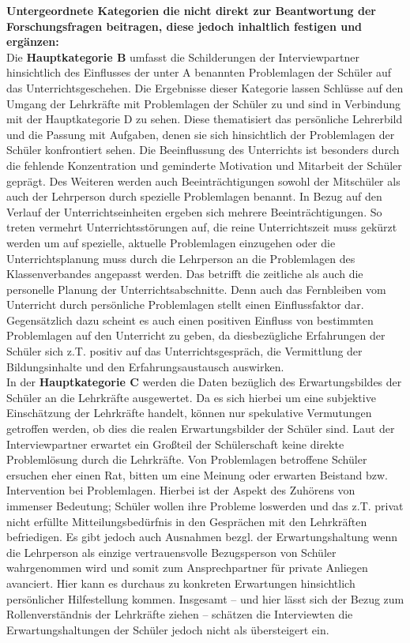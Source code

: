 \noindent
\textbf{Untergeordnete Kategorien die nicht direkt zur Beantwortung der Forschungsfragen beitragen, diese jedoch inhaltlich festigen und ergänzen:}\\

\noindent
Die \textbf{Hauptkategorie B} umfasst die Schilderungen der Interviewpartner hinsichtlich des Einflusses der unter A benannten Problemlagen der Schüler auf das Unterrichtsgeschehen. Die Ergebnisse dieser Kategorie lassen Schlüsse auf den Umgang der Lehrkräfte mit Problemlagen der Schüler zu und sind in Verbindung mit der Hauptkategorie D zu sehen. Diese thematisiert das persönliche Lehrerbild und die Passung mit Aufgaben, denen sie sich hinsichtlich der Problemlagen der Schüler konfrontiert sehen. Die Beeinflussung des Unterrichts ist besonders durch die fehlende Konzentration und geminderte Motivation und Mitarbeit der Schüler geprägt. Des Weiteren werden auch Beeinträchtigungen sowohl der Mitschüler als auch der Lehrperson durch spezielle Problemlagen benannt. In Bezug auf den Verlauf der Unterrichtseinheiten ergeben sich mehrere Beeinträchtigungen. So treten vermehrt Unterrichtsstörungen auf, die reine Unterrichtszeit muss gekürzt werden um auf spezielle, aktuelle Problemlagen einzugehen oder die Unterrichtsplanung muss durch die Lehrperson an die Problemlagen des Klassenverbandes angepasst werden. Das betrifft die zeitliche als auch die personelle Planung der Unterrichtsabschnitte. Denn auch das Fernbleiben vom Unterricht durch persönliche Problemlagen stellt einen Einflussfaktor dar. Gegensätzlich dazu scheint es auch einen positiven Einfluss von bestimmten Problemlagen auf den Unterricht zu geben, da diesbezügliche Erfahrungen der Schüler sich z.T. positiv auf das Unterrichtsgespräch, die Vermittlung der Bildungsinhalte und den Erfahrungsaustausch auswirken.\\

\noindent
In der \textbf{Hauptkategorie C} werden die Daten bezüglich des Erwartungsbildes der Schüler an die Lehrkräfte ausgewertet. Da es sich hierbei um eine subjektive Einschätzung der Lehrkräfte handelt, können nur spekulative Vermutungen getroffen werden, ob dies die realen Erwartungsbilder der Schüler sind. Laut der Interviewpartner erwartet ein Großteil der Schülerschaft keine direkte Problemlösung durch die Lehrkräfte. Von Problemlagen betroffene Schüler ersuchen eher einen Rat, bitten um eine Meinung oder erwarten Beistand bzw. Intervention bei Problemlagen. Hierbei ist der Aspekt des Zuhörens von immenser Bedeutung; Schüler wollen ihre Probleme loswerden und das z.T. privat nicht erfüllte Mitteilungsbedürfnis in den Gesprächen mit den Lehrkräften befriedigen. Es gibt jedoch auch Ausnahmen bezgl. der Erwartungshaltung wenn die Lehrperson als einzige vertrauensvolle Bezugsperson von Schüler wahrgenommen wird und somit zum Ansprechpartner für private Anliegen avanciert. Hier kann es durchaus zu konkreten Erwartungen hinsichtlich persönlicher Hilfestellung kommen. Insgesamt -- und hier lässt sich der Bezug zum Rollenverständnis der Lehrkräfte ziehen -- schätzen die Interviewten die Erwartungshaltungen der Schüler jedoch nicht als übersteigert ein.\\

